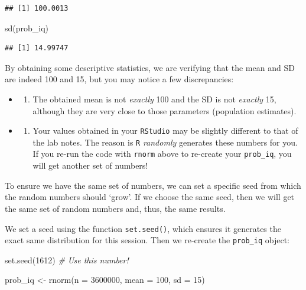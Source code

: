\documentclass[
]{book}
\newenvironment{Shaded}{\begin{snugshade}}{\end{snugshade}}
\newcommand{\AttributeTok}[1]{\textcolor[rgb]{0.77,0.63,0.00}{#1}}
\newcommand{\CommentTok}[1]{\textcolor[rgb]{0.56,0.35,0.01}{\textit{#1}}}
\newcommand{\DecValTok}[1]{\textcolor[rgb]{0.00,0.00,0.81}{#1}}
\newcommand{\FunctionTok}[1]{\textcolor[rgb]{0.00,0.00,0.00}{#1}}
\newcommand{\NormalTok}[1]{#1}
\newcommand{\OtherTok}[1]{\textcolor[rgb]{0.56,0.35,0.01}{#1}}
\providecommand{\tightlist}{%
  \setlength{\itemsep}{0pt}\setlength{\parskip}{0pt}}
\begin{document}
\begin{verbatim}
## [1] 100.0013
\end{verbatim}

\begin{Shaded}
\begin{Highlighting}[]
\FunctionTok{sd}\NormalTok{(prob\_iq) }
\end{Highlighting}
\end{Shaded}

\begin{verbatim}
## [1] 14.99747
\end{verbatim}

By obtaining some descriptive statistics, we are verifying that the mean and SD are indeed 100 and 15, but you may notice a few discrepancies:

\begin{itemize}
\item
  \begin{enumerate}
  \def\labelenumi{\arabic{enumi}.}
  \tightlist
  \item
    The obtained mean is not \emph{exactly} 100 and the SD is not \emph{exactly} 15, although they are very close to those parameters (population estimates).
  \end{enumerate}
\item
  \begin{enumerate}
  \def\labelenumi{\arabic{enumi}.}
  \setcounter{enumi}{1}
  \tightlist
  \item
    Your values obtained in your \texttt{RStudio} may be slightly different to that of the lab notes. The reason is \texttt{R} \emph{randomly} generates these numbers for you. If you re-run the code with \texttt{rnorm} above to re-create your \texttt{prob\_iq}, you will get another set of numbers!
  \end{enumerate}
\end{itemize}

To ensure we have the same set of numbers, we can set a specific seed from which the random numbers should `grow'. If we choose the same seed, then we will get the same set of random numbers and, thus, the same results.

We set a seed using the function \texttt{set.seed()}, which ensures it generates the exact same distribution for this session. Then we re-create the \texttt{prob\_iq} object:

\begin{Shaded}
\begin{Highlighting}[]
\FunctionTok{set.seed}\NormalTok{(}\DecValTok{1612}\NormalTok{) }\CommentTok{\# Use this number! }

\NormalTok{prob\_iq }\OtherTok{\textless{}{-}} \FunctionTok{rnorm}\NormalTok{(}\AttributeTok{n =} \DecValTok{3600000}\NormalTok{, }\AttributeTok{mean =} \DecValTok{100}\NormalTok{, }\AttributeTok{sd =} \DecValTok{15}\NormalTok{)}
\end{Highlighting}
\end{Shaded}
\end{document}
